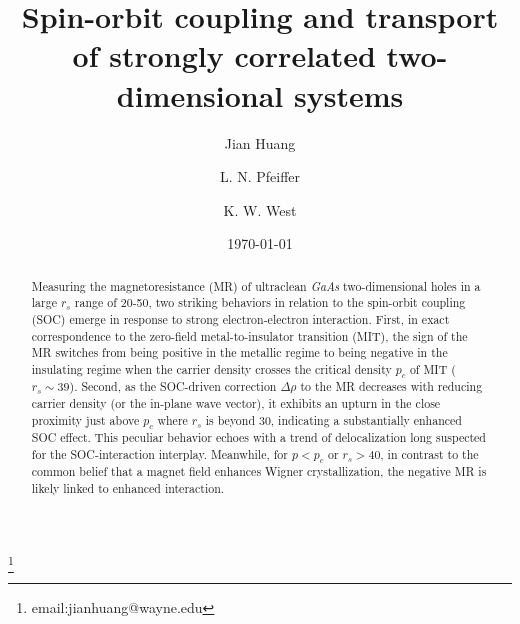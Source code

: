 \documentclass[twocolumn,secnumarabic,amssymb, nobibnotes, aps, prd]{revtex4-1}
\begin{document}

\title{Spin-orbit coupling and transport of strongly correlated two-dimensional systems}%
\thanks{email:jianhuang@wayne.edu}

\author{Jian Huang}
%
\author{L. N. Pfeiffer}%
\author{K. W. West}%
%

\date{\today}%

\begin{abstract}
{Measuring the magnetoresistance (MR) of ultraclean {\it GaAs} two-dimensional holes in a large $r_s$ range of 20-50, two striking behaviors in relation to the spin-orbit coupling (SOC) emerge in response to strong electron-electron interaction. First, in exact correspondence to the zero-field metal-to-insulator transition (MIT), the sign of the MR switches from being positive in the metallic regime to being negative in the insulating regime when the carrier density crosses the critical density $p_c$ of MIT ($r_s\sim 39$). Second, as the SOC-driven correction $\Delta\rho$ to the MR decreases with reducing carrier density (or the in-plane wave vector), it exhibits an upturn in the close proximity just above $p_c$ where $r_s$ is beyond 30, indicating a substantially enhanced SOC effect. This peculiar behavior echoes with a trend of delocalization long suspected for the SOC-interaction interplay. Meanwhile, for $p<p_c$ or $r_s>40$, in contrast to the common belief that a magnet field enhances Wigner crystallization, the negative MR is likely linked to enhanced interaction.}
\end{abstract}

\maketitle
\end{document}
